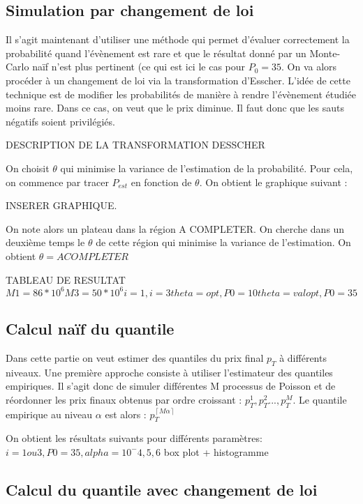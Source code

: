 \documentclass[a4paper,11pt]{article}
\begin{document}
\subsection{Simulation par changement de loi}

Il s'agit maintenant d'utiliser une méthode qui permet d'évaluer correctement la probabilité quand l'évènement est rare et que le résultat donné par un Monte-Carlo naïf n'est plus pertinent (ce qui est ici le cas pour $P_{0}=35$. On va alors procéder à un changement de loi via la transformation d'Esscher. L'idée de cette technique est de modifier les probabilités de manière à rendre l'évènement étudiée moins rare. Dans ce cas, on veut que le prix diminue. Il faut donc que les sauts négatifs soient privilégiés. 

DESCRIPTION DE LA TRANSFORMATION DESSCHER

On choisit $\theta$ qui minimise la variance de l'estimation de la probabilité. Pour cela, on commence par tracer $P_{est}$ en fonction de $\theta$. On obtient le graphique suivant :

INSERER GRAPHIQUE.

On note alors un plateau dans la région A COMPLETER. On cherche dans un deuxième temps le $\theta$ de cette région qui minimise la variance de l'estimation. 
On obtient $\theta= A COMPLETER$

TABLEAU DE RESULTAT
$M1=86 * 10^6
M3=50 * 10^6
i=1, i=3
theta=opt, P0=10
theta=val opt, P0=35
$
\subsection{Calcul naïf du quantile}
Dans cette partie on veut estimer des quantiles du prix final $p_{T}$ à différents niveaux. Une première approche consiste à utiliser l'estimateur des quantiles empiriques. Il s'agit donc de simuler différentes M processus de Poisson et de réordonner les prix finaux obtenus par ordre croissant : $p_{T}^{1}, p_{T}^{2}..., p_{T}^{M}$. Le quantile empirique au niveau $\alpha$ est alors : $p_{T}^{\left \lceil M\alpha  \right \rceil} $

On obtient les résultats suivants pour différents paramètres:
$i=1 ou 3, P0=35, alpha=10^-4, 5, 6
$ box plot + histogramme

\subsection{Calcul du quantile avec changement de loi}
\end{document}
